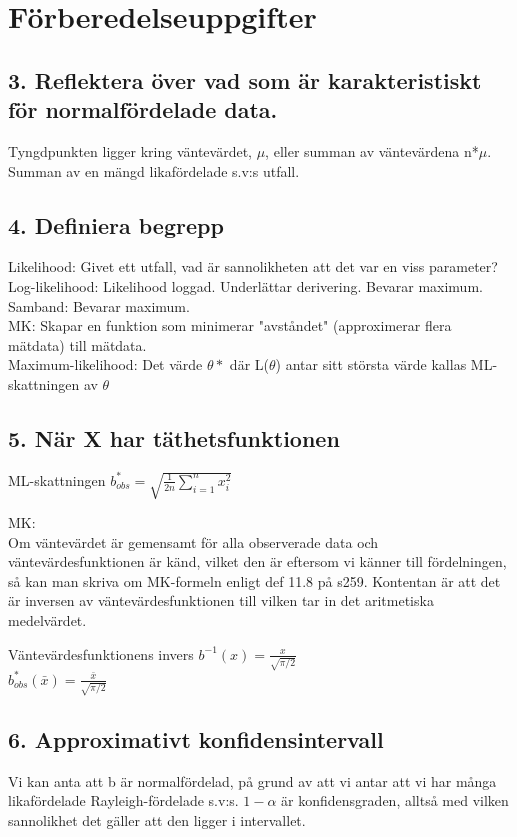 \documentclass{article}
\begin{document}
\section*{Förberedelseuppgifter}

\subsection*{3. Reflektera över vad som är karakteristiskt för normalfördelade
data.}
Tyngdpunkten ligger kring väntevärdet, $\mu$, eller summan av väntevärdena
n*$\mu$.
Summan av en mängd likafördelade s.v:s utfall.

\subsection*{4. Definiera begrepp}
Likelihood: Givet ett utfall, vad är sannolikheten att det var en viss
parameter?\\
Log-likelihood: Likelihood loggad. Underlättar derivering. Bevarar maximum.\\
Samband: Bevarar maximum.\\
MK: Skapar en funktion som minimerar "avståndet" (approximerar flera mätdata)
till mätdata. \\
Maximum-likelihood: Det värde $\theta*$ där L($\theta$) antar sitt största värde
kallas ML-skattningen av $\theta$ \\

\subsection*{5. När X har täthetsfunktionen}
ML-skattningen $b_{obs}^* = \sqrt{\frac{1}{2n}\sum\limits_{i=1}^n x_i^2}$

MK:\\
Om väntevärdet är gemensamt för alla observerade data och väntevärdesfunktionen
är känd, vilket den är eftersom vi känner till fördelningen, så kan man skriva
om MK-formeln enligt def 11.8 på s259. Kontentan är att det är inversen av
väntevärdesfunktionen till vilken tar in det aritmetiska medelvärdet.

Väntevärdesfunktionens invers $b^{-1}(x) = \frac{x}{\sqrt{\pi/2}}$ \\
$b_{obs}^*(\bar{x}) = \frac{\bar{x}}{\sqrt{\pi/2}}$


\subsection*{6. Approximativt konfidensintervall}
Vi kan anta att b är normalfördelad, på grund av att vi antar att vi har många
likafördelade Rayleigh-fördelade s.v:s. $1 - \alpha$ är konfidensgraden, alltså
med vilken sannolikhet det gäller att den ligger i intervallet.
\end{document}
